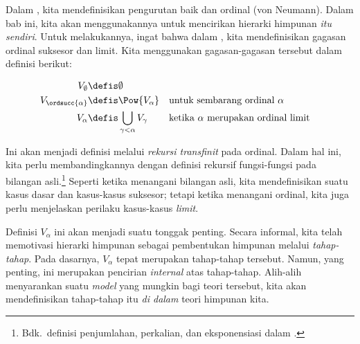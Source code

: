 \documentclass[../../../include/open-logic-section]{subfiles}
\begin{document}


Dalam , kita mendefinisikan pengurutan baik dan
ordinal (von Neumann). Dalam bab ini, kita akan menggunakannya untuk
mencirikan hierarki himpunan \emph{itu sendiri}. Untuk melakukannya, ingat
bahwa dalam , kita mendefinisikan gagasan
ordinal suksesor dan limit. Kita menggunakan gagasan-gagasan tersebut dalam
definisi berikut:

\begin{defn}
	\begin{align*}
	V_\emptyset &\defis \emptyset\\
	V_{\ordsucc{\alpha}} &\defis \Pow{V_\alpha} & &
	\text{untuk sembarang ordinal }\alpha\\
	V_{\alpha} &\defis \bigcup_{\gamma < \alpha} V_\gamma & &
	\text{ketika }\alpha\text{ merupakan ordinal limit}
\end{align*}
\end{defn}
\noindent
Ini akan menjadi definisi melalui \emph{rekursi transfinit} pada ordinal.
Dalam hal ini, kita perlu membandingkannya dengan definisi rekursif
fungsi-fungsi pada bilangan asli.\footnote{Bdk.\ definisi penjumlahan,
perkalian, dan eksponensiasi dalam
.} Seperti ketika menangani bilangan
asli, kita mendefinisikan suatu kasus dasar dan kasus-kasus suksesor; tetapi
ketika menangani ordinal, kita juga perlu menjelaskan perilaku kasus-kasus
\emph{limit}.

Definisi $V_\alpha$ ini akan menjadi suatu tonggak penting. Secara informal,
kita telah memotivasi hierarki himpunan sebagai pembentukan himpunan melalui
\emph{tahap-tahap}. Pada dasarnya, $V_\alpha$ tepat merupakan tahap-tahap
tersebut. Namun, yang penting, ini merupakan pencirian \emph{internal} atas
tahap-tahap. Alih-alih menyarankan suatu \emph{model} yang mungkin bagi
teori tersebut, kita akan mendefinisikan tahap-tahap itu \emph{di dalam}
teori himpunan kita.
\end{document}
